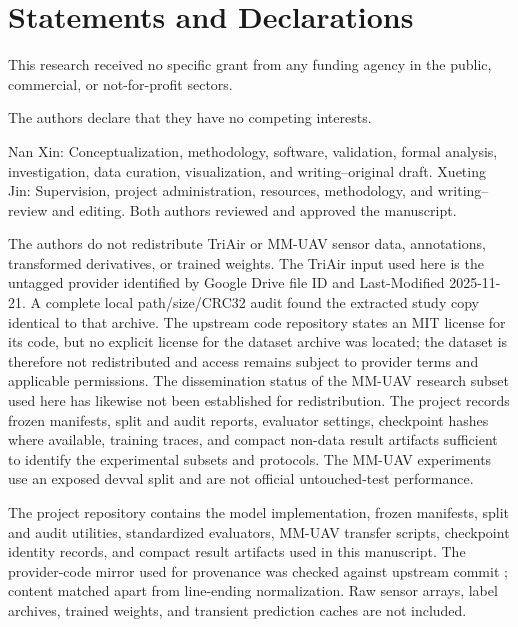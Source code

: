 \section*{Statements and Declarations}
This research received no specific grant from any funding agency in the public, commercial, or not-for-profit sectors.

The authors declare that they have no competing interests.

Nan Xin: Conceptualization, methodology, software, validation, formal analysis, investigation, data curation, visualization, and writing--original draft. Xueting Jin: Supervision, project administration, resources, methodology, and writing--review and editing. Both authors reviewed and approved the manuscript.

The authors do not redistribute TriAir or MM-UAV sensor data, annotations, transformed derivatives, or trained weights. The TriAir input used here is the untagged provider  identified by Google Drive file ID  and Last-Modified 2025-11-21. A complete local path/size/CRC32 audit found the extracted study copy identical to that archive. The upstream code repository states an MIT license for its code, but no explicit license for the dataset archive was located; the dataset is therefore not redistributed and access remains subject to provider terms and applicable permissions. The dissemination status of the MM-UAV research subset used here has likewise not been established for redistribution. The project records frozen manifests, split and audit reports, evaluator settings, checkpoint hashes where available, training traces, and compact non-data result artifacts sufficient to identify the experimental subsets and protocols. The MM-UAV experiments use an exposed devval split and are not official untouched-test performance.

The project repository contains the model implementation, frozen manifests, split and audit utilities, standardized evaluators, MM-UAV transfer scripts, checkpoint identity records, and compact result artifacts used in this manuscript. The provider-code mirror used for provenance was checked against upstream commit ; content matched apart from line-ending normalization. Raw sensor arrays, label archives, trained weights, and transient prediction caches are not included.

